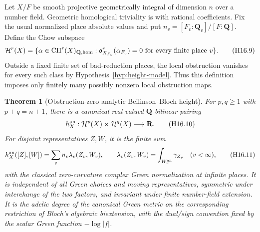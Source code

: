 \documentclass[11pt,a4paper]{article}
\newtheorem{theorem}{Theorem}[section]
\theoremstyle{definition}
\theoremstyle{remark}
\numberwithin{equation}{section}
\begin{document}
Let $X/F$ be smooth projective geometrically integral of dimension $n$
over a number field. Geometric homological triviality is with rational
coefficients. Fix the usual normalized place absolute values and put
$n_v=[F_v:\mathbf Q_v]/[F:\mathbf Q]$. Define the Chow subspace
\[
 \mathcal H^r(X)=\{\alpha\in\operatorname{CH}^r(X)_{\mathbf Q,\rm hom}:
       \mathfrak o_{X_{F_v}}^r(\alpha_{F_v})=0
                    \text{ for every finite place }v\}.
 \tag{H16.9}\label{r16h:height-domain}
\]
Outside a fixed finite set of bad-reduction places, the local
obstruction vanishes for every such class by Hypothesis~\ref{hyp:height-model}.
Thus this definition imposes
only finitely many possibly nonzero local obstruction maps.

\begin{theorem}[Obstruction-zero analytic Beilinson--Bloch height]
\label{r16h:global-height}
For $p,q\geq1$ with $p+q=n+1$, there is a canonical real-valued
$\mathbf Q$-bilinear pairing
\[
 h_X^{\rm an}:\mathcal H^p(X)\times\mathcal H^q(X)\longrightarrow\mathbf R.
 \tag{H16.10}\label{r16h:height}
\]
For disjoint representatives $Z,W$, it is the finite sum
\[
 h_X^{\rm an}([Z],[W])
         =\sum_v n_v\lambda_v(Z_v,W_v),\qquad
 \lambda_v(Z_v,W_v)=\int_{W_v^{\rm an}}\gamma_{Z_v}\quad(v<\infty),
 \tag{H16.11}\label{r16h:height-sum}
\]
with the classical zero-curvature complex Green normalization at
infinite places. It is independent of all Green choices and moving
representatives, symmetric under interchange of the two factors, and
invariant under finite number-field extension. It is the adelic degree
of the canonical Green metric on the corresponding restriction of
Bloch's algebraic biextension, with the dual/sign convention fixed
by the scalar Green function $-\log|f|$.
\end{theorem}
\end{document}

